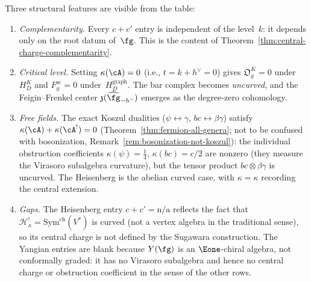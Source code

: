 \begin{remark}\label{rem:reading-master-table}
Three structural features are visible from the table:
\begin{enumerate}
\item \emph{Complementarity.}
 Every $c + c'$ entry is independent of the level~$k$: it depends
 only on the root datum of~$\fg$.
 This is the content of Theorem~\ref{thm:central-charge-complementarity}.
\item \emph{Critical level.}
 Setting $\kappa(\cA) = 0$ (i.e., $t = k + h^\vee = 0$)
 gives $\mathfrak O_g^K=0$ under~$H_D^K$ and
 $F_g^{\mathrm{sc}}=0$ under~$H_D^{\mathrm{graph}}$.
 The bar complex becomes \emph{uncurved}, and
 the Feigin--Frenkel center $\mathfrak{z}(\widehat{\fg}_{-h^\vee})$
 emerges as the degree-zero cohomology.
\item \emph{Free fields.}
 The exact Koszul dualities ($\psi \leftrightarrow \gamma$,
 $bc \leftrightarrow \beta\gamma$) satisfy
 $\kappa(\cA) + \kappa(\cA^!) = 0$
 (Theorem~\ref{thm:fermion-all-genera};
 not to be confused with bosonization,
 Remark~\ref{rem:bosonization-not-koszul}): the individual
 obstruction coefficients $\kappa(\psi) = \tfrac{1}{4}$,
 $\kappa(bc) = c/2$ are nonzero (they measure the
 Virasoro subalgebra curvature), but the tensor product
 $bc \otimes \beta\gamma$ is uncurved.
 The Heisenberg is the abelian curved case, with
 $\kappa = \kappa$ recording the central extension.
\item \emph{Gaps.}
 The Heisenberg entry $c + c' = \text{n/a}$ reflects the fact that
 $\mathcal{H}_\kappa^! = \mathrm{Sym}^{\mathrm{ch}}(V^*)$ is
 curved (not a vertex algebra in the traditional sense), so
 its central charge is not defined by the Sugawara construction.
 The Yangian entries are blank because $Y(\fg)$ is an $\Eone$-chiral
 algebra, not conformally graded: it has no Virasoro subalgebra
 and hence no central charge or obstruction coefficient in the
 sense of the other rows.
\end{enumerate}
\end{remark}

